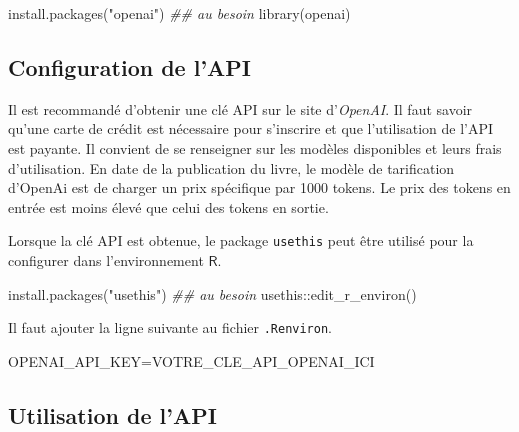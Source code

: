 \documentclass[
  letterpaper,
  DIV=11,
  numbers=noendperiod,
  oneside]{scrreprt}
\newenvironment{Shaded}{\begin{snugshade}}{\end{snugshade}}
\newcommand{\DocumentationTok}[1]{\textcolor[rgb]{0.37,0.37,0.37}{\textit{#1}}}
\newcommand{\FunctionTok}[1]{\textcolor[rgb]{0.28,0.35,0.67}{#1}}
\newcommand{\NormalTok}[1]{\textcolor[rgb]{0.00,0.23,0.31}{#1}}
\newcommand{\OtherTok}[1]{\textcolor[rgb]{0.00,0.23,0.31}{#1}}
\newcommand{\SpecialCharTok}[1]{\textcolor[rgb]{0.37,0.37,0.37}{#1}}
\newcommand{\StringTok}[1]{\textcolor[rgb]{0.13,0.47,0.30}{#1}}
\begin{document}
\begin{Shaded}
\begin{Highlighting}[]
\FunctionTok{install.packages}\NormalTok{(}\StringTok{"openai"}\NormalTok{) }\DocumentationTok{\#\# au besoin}
\FunctionTok{library}\NormalTok{(openai)}
\end{Highlighting}
\end{Shaded}

\hypertarget{configuration-de-lapi}{%
\subsection{Configuration de l'API}\label{configuration-de-lapi}}

Il est recommandé d'obtenir une clé API sur le site d'\emph{OpenAI}. Il
faut savoir qu'une carte de crédit est nécessaire pour s'inscrire et que
l'utilisation de l'API est payante. Il convient de se renseigner sur les
modèles disponibles et leurs frais d'utilisation. En date de la
publication du livre, le modèle de tarification d'OpenAi est de charger
un prix spécifique par 1000 tokens. Le prix des tokens en entrée est
moins élevé que celui des tokens en sortie.

Lorsque la clé API est obtenue, le package \texttt{usethis} peut être
utilisé pour la configurer dans l'environnement \(\textsf{R}\).

\begin{Shaded}
\begin{Highlighting}[]
\FunctionTok{install.packages}\NormalTok{(}\StringTok{"usethis"}\NormalTok{) }\DocumentationTok{\#\# au besoin}
\NormalTok{usethis}\SpecialCharTok{::}\FunctionTok{edit\_r\_environ}\NormalTok{()}
\end{Highlighting}
\end{Shaded}

Il faut ajouter la ligne suivante au fichier \texttt{.Renviron}.

\begin{Shaded}
\begin{Highlighting}[]
\NormalTok{OPENAI\_API\_KEY}\OtherTok{=}\NormalTok{VOTRE\_CLE\_API\_OPENAI\_ICI}
\end{Highlighting}
\end{Shaded}

\hypertarget{utilisation-de-lapi}{%
\subsection{Utilisation de l'API}\label{utilisation-de-lapi}}
\end{document}
